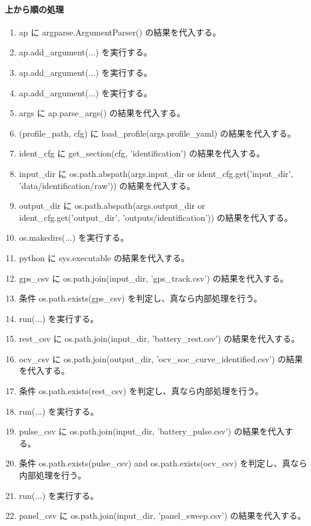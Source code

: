 \documentclass[a4paper,11pt]{article}
\begin{document}
            \paragraph{上から順の処理}
            \begin{enumerate}[leftmargin=1.8em]
            \item ap に argparse.ArgumentParser() の結果を代入する。
\item ap.add\_argument(...) を実行する。
\item ap.add\_argument(...) を実行する。
\item ap.add\_argument(...) を実行する。
\item args に ap.parse\_args() の結果を代入する。
\item (profile\_path, cfg) に load\_profile(args.profile\_yaml) の結果を代入する。
\item ident\_cfg に get\_section(cfg, 'identification') の結果を代入する。
\item input\_dir に os.path.abspath(args.input\_dir or ident\_cfg.get('input\_dir', 'data/identification/raw')) の結果を代入する。
\item output\_dir に os.path.abspath(args.output\_dir or ident\_cfg.get('output\_dir', 'outputs/identification')) の結果を代入する。
\item os.makedirs(...) を実行する。
\item python に sys.executable の結果を代入する。
\item gps\_csv に os.path.join(input\_dir, 'gps\_track.csv') の結果を代入する。
\item 条件 os.path.exists(gps\_csv) を判定し、真なら内部処理を行う。
\item   run(...) を実行する。
\item rest\_csv に os.path.join(input\_dir, 'battery\_rest.csv') の結果を代入する。
\item ocv\_csv に os.path.join(output\_dir, 'ocv\_soc\_curve\_identified.csv') の結果を代入する。
\item 条件 os.path.exists(rest\_csv) を判定し、真なら内部処理を行う。
\item   run(...) を実行する。
\item pulse\_csv に os.path.join(input\_dir, 'battery\_pulse.csv') の結果を代入する。
\item 条件 os.path.exists(pulse\_csv) and os.path.exists(ocv\_csv) を判定し、真なら内部処理を行う。
\item   run(...) を実行する。
\item panel\_csv に os.path.join(input\_dir, 'panel\_sweep.csv') の結果を代入する。

\end{enumerate}
\end{document}
